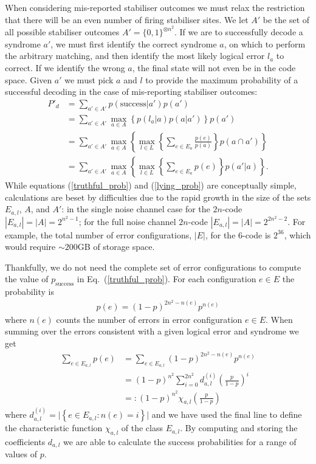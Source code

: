 When considering mis-reported stabiliser outcomes we must relax the restriction that there will be an even number of firing stabiliser sites. We let $A'$ be the set of all possible stabiliser outcomes $A' = \{0, 1\}^{\otimes n^2}$. If we are to successfully decode a syndrome $a'$, we must first identify the correct syndrome $a$, on which to perform the arbitrary matching, and then identify the most likely logical error $l_a$ to correct. If we identify the wrong $a$, the final state will not even be in the code space. Given $a'$ we must pick $a$ and $l$ to provide the maximum probability of a successful decoding in the case of mis-reporting stabiliser outcomes:
\begin{align}
  P'_d &= \sum_{a' \in A'} p(\text{success} \vert a') p(a') \\
  &= \sum_{a'\in A'} \max_{a \in A} \left\{ p(l_a \vert a) p(a \vert a') \right\} p(a')\\
  &= \sum_{a'\in A'} \max_{a \in A} \left\{ \max_{l \in L} \left\{\sum_{e \in E_a} \frac{p(e)}{p(a)} \right\} p(a \cap a') \right\}\\
  &= \sum_{a'\in A'} \max_{a \in A} \left\{ \max_{l \in L} \left\{\sum_{e \in E_a} p(e) \right\} p(a' \vert a) \right\}. \label{lying_prob}
\end{align}
While equations (\ref{truthful_prob}) and (\ref{lying_prob}) are conceptually simple, calculations are beset by difficulties due to the rapid growth in the size of the sets $E_{a,l}$, $A$, and $A'$: in the single noise channel case for the $2n$-code $|E_{a,l}| = |A| = 2^{n^2-1}$; for the full noise channel $2n$-code $|E_{a,l}| = |A| = 2^{2n^2 - 2}$. For example, the total number of error configurations, $|E|$, for the $6$-code is $2^{36}$, which would require $\sim200$GB of storage space.

Thankfully, we do not need the complete set of error configurations to compute the value of $p_\text{success}$ in Eq.~(\ref{truthful_prob}). For each configuration $e\in E$ the probability is
\begin{align}
  p(e) = (1-p)^{2n^2 - n(e)} p^{n(e)}
\end{align}
where $n(e)$ counts the number of errors in error configuration $e \in E$. When summing over the errors consistent with a given logical error and syndrome we get
\begin{align}
  \sum_{e \in E_{a,l}} p(e) &= \sum_{e \in E_{a,l}} (1-p)^{2n^2 - n(e)} p^{n(e)} \\
  &= (1-p)^{n^2} \sum_{i = 0}^{2n^2} d_{a,l}^{(i)} \left(\frac{p}{1-p}\right)^i \\
  &=: (1-p)^{n^2} \chi_{a,l}\left(\frac{p}{1-p}\right)
\end{align}
where $d_{a,l}^{(i)} = \vert \left\{e \in E_{a,l} : n(e)=i \right\} \vert$ and we have used the final line to define the characteristic function $\chi_{a,l}$ of the class $E_{a,l}$. By computing and storing the coefficients $d_{a,l}$ we are able to calculate the success probabilities for a range of values of $p$.

